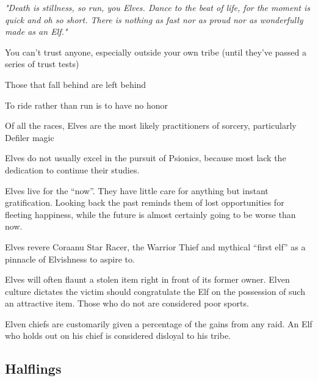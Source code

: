 \begin{multicols}{2}
\begin{description}
    \item \textit{"Death is stillness, so run, you Elves. Dance to the beat of life, for the moment is quick and oh so short. There is nothing as fast nor as proud nor as wonderfully made as an Elf."}
    \item You can’t trust anyone, especially outside your own tribe (until they’ve passed a series of trust tests)
    \item Those that fall behind are left behind
    \item To ride rather than run is to have no honor
    \item Of all the races, Elves are the most likely practitioners of sorcery, particularly Defiler magic
    \item Elves do not usually excel in the pursuit of Psionics, because most lack the dedication to continue their studies.
    \item Elves live for the “now”. They have little care for anything but instant gratification. Looking back the past reminds them of lost opportunities for fleeting happiness, while the future is almost certainly going to be worse than now.
    \item Elves revere Coraanu Star Racer, the Warrior Thief and mythical “first elf” as a pinnacle of Elvishness to aspire to.
    \item Elves will often flaunt a stolen item right in front of its former owner. Elven culture dictates the victim should congratulate the Elf on the possession of such an attractive item. Those who do not are considered poor sports.
    \item Elven chiefs are customarily given a percentage of the gains from any raid. An Elf who holds out on his chief is considered disloyal to his tribe.
\end{description}

\subsection{Halflings}


\end{multicols}
